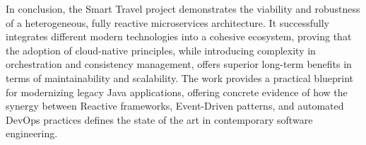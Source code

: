 In conclusion, the Smart Travel project demonstrates the viability and robustness of a heterogeneous, fully reactive microservices architecture. It successfully integrates different modern technologies into a cohesive ecosystem, proving that the adoption of cloud-native principles, while introducing complexity in orchestration and consistency management, offers superior long-term benefits in terms of maintainability and scalability. The work provides a practical blueprint for modernizing legacy Java applications, offering concrete evidence of how the synergy between Reactive frameworks, Event-Driven patterns, and automated DevOps practices defines the state of the art in contemporary software engineering.
